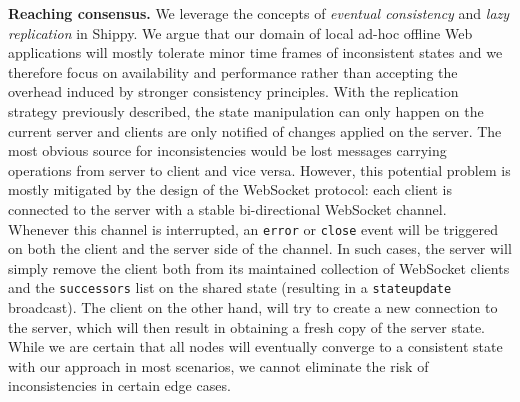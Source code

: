 \textbf{Reaching consensus.}
We leverage the concepts of \textit{eventual consistency} and \textit{lazy replication} in Shippy.
We argue that our domain of local ad-hoc offline Web applications will mostly tolerate minor time frames of inconsistent states and we therefore focus on availability and performance rather than accepting the overhead induced by stronger consistency principles.
With the replication strategy previously described, the state manipulation can only happen on the current server and clients are only notified of changes applied on the server.
The most obvious source for inconsistencies would be lost messages carrying operations from server to client and vice versa.
However, this potential problem is mostly mitigated by the design of the WebSocket protocol: each client is connected to the server with a stable bi-directional WebSocket channel. 
Whenever this channel is interrupted, an \texttt{error} or \texttt{close} event will be triggered on both the client and the server side of the channel.
In such cases, the server will simply remove the client both from its maintained collection of WebSocket clients and the \texttt{successors} list on the shared state (resulting in a \texttt{stateupdate} broadcast). 
The client on the other hand, will try to create a new connection to the server, which will then result in obtaining a fresh copy of the server state.
While we are certain that all nodes will eventually converge to a consistent state with our approach in most scenarios, we cannot eliminate the risk of inconsistencies in certain edge cases.